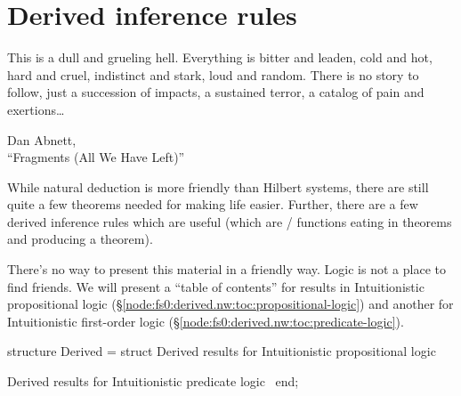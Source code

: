 \nwenddocs{}%

\section{Derived inference rules}

\epigraph{This is a dull and grueling hell. Everything is bitter and
  leaden, cold and hot, hard and cruel, indistinct and stark, loud and
  random. There is no story to follow, just a succession of impacts, a
  sustained terror, a catalog of pain and exertions\dots}{Dan Abnett,\\
  ``Fragments (All We Have Left)''}%

\begin{node}
While natural deduction is more friendly than Hilbert systems, there
are still quite a few theorems needed for making life easier. Further,
there are a few derived inference rules which are useful (which are
\SML/ functions eating in theorems and producing a theorem).

There's no way to present this material in a friendly way. Logic is
not a place to find friends. We will present a ``table of contents''
for results in Intuitionistic propositional logic (\S\ref{node:fs0:derived.nw:toc:propositional-logic})
and another for Intuitionistic first-order logic (\S\ref{node:fs0:derived.nw:toc:predicate-logic}).
\end{node}

\nwenddocs{}\endmoddef\nwstartdeflinemarkup\nwenddeflinemarkup
structure Derived = struct
\LA{}Derived results for Intuitionistic propositional logic~{\nwtagstyle{}}\RA{}

\LA{}Derived results for Intuitionistic predicate logic~{\nwtagstyle{}}\RA{}
end;
\nwendcode{}\nwdocspar

